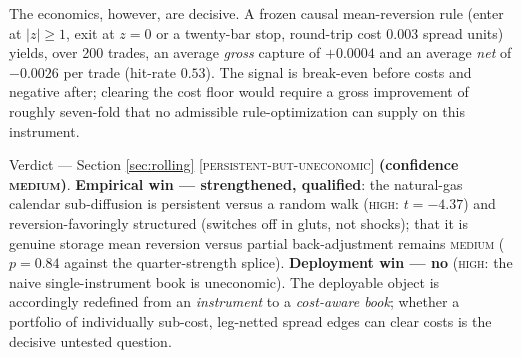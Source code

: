 \documentclass[11pt,a4paper]{article}
\newcommand{\status}[1]{{\small\textsc{[#1]}}}
\begin{document}
\begin{table}[h]
\centering
\small
{}
\caption{Rolling-local persistence. The natural-gas pooled distance is statistically indistinguishable
from the quarter-strength splice anchor ($p=0.84$), so genuine reversion versus partial back-adjustment
remains \textsc{medium} confidence.}
\label{tab:rolling}
\end{table}

The economics, however, are decisive. A frozen causal mean-reversion rule (enter at $|z|\geq 1$, exit
at $z=0$ or a twenty-bar stop, round-trip cost $0.003$ spread units) yields, over 200 trades, an
average \emph{gross} capture of $+0.0004$ and an average \emph{net} of $-0.0026$ per trade
(hit-rate $0.53$). The signal is break-even before costs and negative after; clearing the cost floor
would require a gross improvement of roughly seven-fold that no admissible rule-optimization can supply
on this instrument.

\begin{verdict}{Verdict --- Section \ref{sec:rolling}}
\small
\status{persistent-but-uneconomic} \textbf{(confidence \textsc{medium})}. \textbf{Empirical win ---
strengthened, qualified}: the natural-gas calendar sub-diffusion is persistent versus a random walk
(\textsc{high}: $t=-4.37$) and reversion-favoringly structured (switches off in gluts, not shocks);
that it is genuine storage mean reversion versus partial back-adjustment remains \textsc{medium}
($p=0.84$ against the quarter-strength splice). \textbf{Deployment win --- no} (\textsc{high}: the naive
single-instrument book is uneconomic). The deployable object is accordingly redefined from an
\emph{instrument} to a \emph{cost-aware book}; whether a portfolio of individually sub-cost,
leg-netted spread edges can clear costs is the decisive untested question.
\end{verdict}
\end{document}
